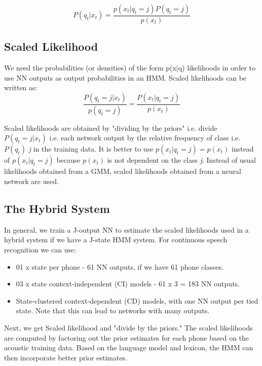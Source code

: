 \begin{equation}
        P(q_{t}|x_{t})=\frac{p(x_{t}|q_{t}=j)P(q_{t}=j)}{p(x_{t})}    
\end{equation}

\subsection{Scaled Likelihood}
We need the probabilities (or densities) of the form p(x|q) likelihoods in order to use NN outputs as output probabilities in an HMM. Scaled likelihoods can be written as:
\begin{equation}
    \frac{P(q_{t}=j|x_{t})}{p(q_{t}=j)}=\frac{P(x_{t}|q_{t}=j)}{p(x_{t})}
\end{equation}

Scaled likelihoods are obtained by "dividing by the priors" i.e. divide $P(q_{t} = j | x_{t})$ i.e. each network output by the relative frequency of class i.e. $P(q_{t} )$ \textit{j} in the training data. It is better to use $p(x_{t}|q_{t} = j)=p(x_{t})$ instead of $p(x_{t} |q_{t} = j)$ because $p(x_{t})$ is not dependent on the class \textit{j}. Instead of usual likelihoods obtained from a GMM, scaled likelihoods obtained from a neural network are used.

\subsection{The Hybrid System}
\label{sub:hybrid-system}
In general, we train a J-output NN to estimate the scaled likelihoods used in a hybrid system if we have a J-state HMM system. For continuous speech recognition we can use\cite{morgan_continuous_1995}: 
\begin{itemize}
    \item 01 x state per phone - 61 NN outputs, if we have 61 phone classes.
    \item 03 x state context-independent (CI) models - 61 x 3 = 183 NN outputs.
    \item State-clustered context-dependent (CD) models, with one NN output per tied state. Note that this can lead to networks with many outputs.
\end{itemize}

Next, we get Scaled likelihood and "divide by the priors." The scaled likelihoods are computed by factoring out the prior estimates for each phone based on the acoustic training data. Based on the language model and lexicon, the HMM can then incorporate better prior estimates.

